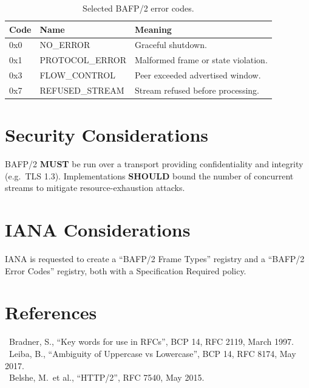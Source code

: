 \documentclass[11pt]{article}
\newcommand{\bcp}[1]{\textbf{\textcolor{accent}{#1}}}   %
\begin{document}
\begin{table}[ht]\centering
\begin{tabularx}{\linewidth}{@{}l l X@{}}
\toprule
\textbf{Code} & \textbf{Name} & \textbf{Meaning}\\
\midrule
0x0 & NO\_ERROR        & Graceful shutdown.\\
0x1 & PROTOCOL\_ERROR  & Malformed frame or state violation.\\
0x3 & FLOW\_CONTROL    & Peer exceeded advertised window.\\
0x7 & REFUSED\_STREAM  & Stream refused before processing.\\
\bottomrule
\end{tabularx}
\caption{Selected BAFP/2 error codes.}
\end{table}

\section{Security Considerations}
BAFP/2 \bcp{MUST} be run over a transport providing confidentiality and integrity (e.g.\
TLS 1.3). Implementations \bcp{SHOULD} bound the number of concurrent streams to mitigate
resource-exhaustion attacks.

\section{IANA Considerations}
IANA is requested to create a ``BAFP/2 Frame Types'' registry and a ``BAFP/2 Error Codes''
registry, both with a Specification Required policy.

\section*{References}
\vspace{-4pt}
{\small\ttfamily
[RFC2119]\ Bradner, S., ``Key words for use in RFCs'', BCP 14, RFC 2119, March 1997.\\
\relax[RFC8174]\ Leiba, B., ``Ambiguity of Uppercase vs Lowercase'', BCP 14, RFC 8174, May 2017.\\
\relax[RFC7540]\ Belshe, M.\ et al., ``HTTP/2'', RFC 7540, May 2015.}
\end{document}
